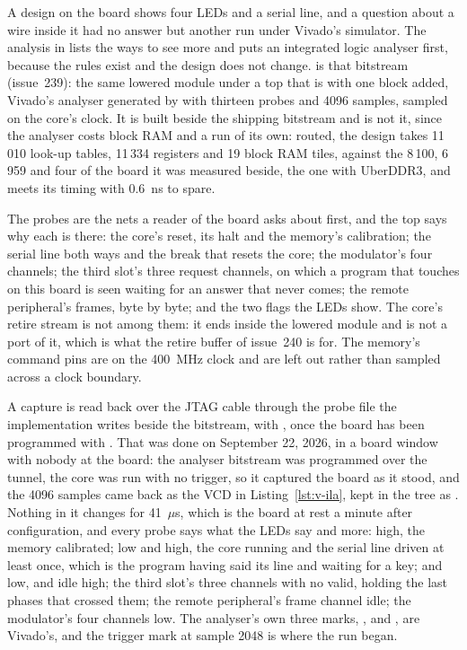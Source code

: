 \documentclass[journal,onecolumn,9pt]{IEEEtran}
\begin{document}
A design on the board shows four LEDs and a serial line, and a
question about a wire inside it had no answer but another run under
Vivado's simulator. The analysis in 
lists the ways to see more and puts an integrated logic analyser
first, because the rules exist and the design does not change.
 is that bitstream
(issue~239): the same lowered module under a top that is
 with one block added, Vivado's analyser
generated by  with thirteen probes and 4096 samples,
sampled on the core's clock. It is built beside the shipping
bitstream and is not it, since the analyser costs block RAM and a
run of its own: routed, the design takes 11\,010 look-up tables,
11\,334 registers and 19 block RAM tiles, against the 8\,100, 6\,959
and four of the board it was measured beside, the one with UberDDR3, and meets its timing with 0.6~ns to spare.

The probes are the nets a reader of the board asks about first, and
the top says why each is there: the core's reset, its halt and the
memory's calibration; the serial line both ways and the break that
resets the core; the modulator's four channels; the third slot's
three request channels, on which a program that touches
 on this board is seen waiting for an answer that never
comes; the remote peripheral's frames, byte by byte; and the two
flags the LEDs show. The core's retire stream is not among them: it
ends inside the lowered module and is not a port of it, which is what
the retire buffer of issue~240 is for. The memory's command pins are
on the 400~MHz clock and are left out rather than sampled across a
clock boundary.

A capture is read back over the JTAG cable through the probe file
the implementation writes beside the bitstream, with
, once the board has
been programmed with . That was done
on September 22, 2026, in a board window with nobody at the board:
the analyser bitstream was programmed over the tunnel, the core was
run with no trigger, so it captured the board as it stood, and the
4096 samples came back as the VCD in Listing~\ref{lst:v-ila}, kept
in the tree as . Nothing in it changes
for 41~$\mu$s, which is the board at rest a minute after
configuration, and every probe says what the LEDs say and more:
 high, the memory calibrated;  low and
 high, the core running and the serial line driven at
least once, which is the program having said its line and waiting
for a key;  and  low,  and
 idle high; the third slot's three channels with no
valid, holding the last phases that crossed them; the remote
peripheral's frame channel idle; the modulator's four channels low.
The analyser's own three marks, , 
and , are Vivado's, and the trigger mark at sample 2048
is where the run began.
\end{document}
